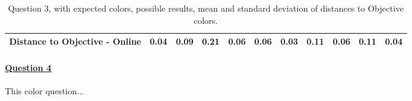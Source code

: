 \begin{table}[H]
{\begin{tabular}{lccccccccccccc}
    \multicolumn{4}{l}{Distance to Objective - Online}                                                                                               & \multicolumn{1}{|c}{\textbf{0.04}}        & \multicolumn{1}{c|}{0.09}    & \multicolumn{1}{|c}{0.21}        & \multicolumn{1}{c|}{0.06}    & \multicolumn{1}{|c}{0.06}       & \multicolumn{1}{c|}{0.03}    & \multicolumn{1}{|c}{0.11}        & \multicolumn{1}{c|}{0.06}    & \multicolumn{1}{|c}{0.11}       & \multicolumn{1}{c|}{0.04}    \\ \hline
    \end{tabular}}
  \caption[Question 3, with expected Results.]{Question 3, with expected colors, possible results, mean and standard deviation of distances to Objective colors.}
  \label{table:lab_q3_expected}
\end{table}
%
\paragraph{\ul{Question 4}}
%
This color question...
%
